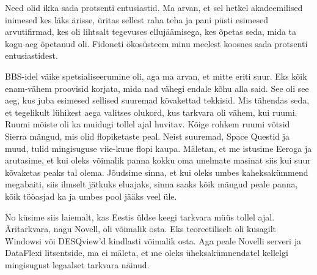 
Need olid ikka sada protsenti entusiastid. Ma arvan, et sel hetkel 
akadeemilised inimesed  kes läks ärisse, üritas sellest raha teha ja pani püsti 
esimesed arvutifirmad, kes oli lihtsalt tegevuses  ellujäämisega, kes õpetas 
seda, mida ta kogu aeg õpetanud oli. Fidoneti ökosüsteem minu meelest koosnes 
sada 
protsenti entusiastidest.


BBS-idel väike spetsialiseerumine oli, aga ma arvan, et mitte eriti suur. Eks 
kõik enam-vähem proovisid korjata, mida nad vähegi endale  kõhu alla said. 
See oli see aeg, kus juba esimesed sellised suuremad kõvakettad tekkisid. 
Mis tähendas seda, et tegelikult lühikest aega valitses olukord, kus tarkvara 
oli vähem, kui ruumi. Ruumi mõiste oli ka muidugi tollel ajal huvitav. Kõige 
rohkem ruumi võtsid Sierra mängud, mis olid flopiketaste peal. Neist suuremad, Space 
Questid ja muud, tulid mingisuguse viie-kuue flopi 
kaupa. Mäletan, et me istusime Eeroga ja arutasime, et 
kui oleks võimalik panna kokku oma unelmate masinat siis kui suur kõvaketas 
peaks tal olema. Jõudsime sinna, et kui oleks umbes kaheksakümmend megabaiti, 
siis ilmselt jätkuks eluajaks, sinna saaks kõik mängud peale panna, kõik 
tööasjad ka ja umbes pool jääks veel üle.


No küsime siis laiemalt, kas Eestis üldse keegi tarkvara müüs tollel ajal. 
Äritarkvara, nagu Novell, oli võimalik osta. Eks teoreetiliselt oli kusagilt 
Windowsi või DESQview'd  kindlasti võimalik osta. Aga peale Novelli serveri ja DataFlexi 
litsentside, ma ei mäleta, et me oleks üheksakümnendatel kellelgi mingisugust 
legaalset tarkvara näinud. 

